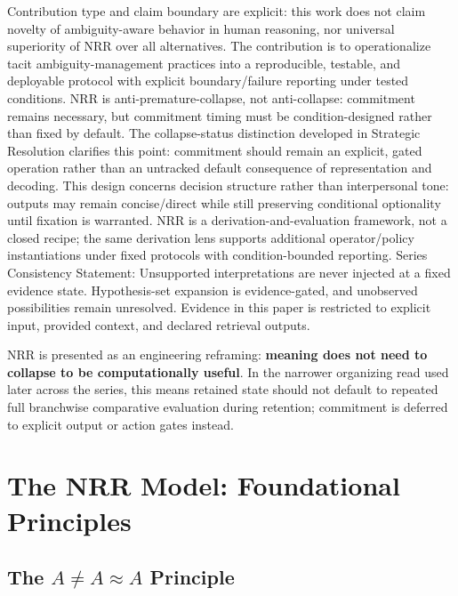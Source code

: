 \documentclass[11pt,a4paper]{article}
\newcommand{\AneqAapproxA}{A \neq A \approx A}
\begin{document}
Contribution type and claim boundary are explicit: this work does not claim novelty of ambiguity-aware behavior in human reasoning, nor universal superiority of NRR over all alternatives. The contribution is to operationalize tacit ambiguity-management practices into a reproducible, testable, and deployable protocol with explicit boundary/failure reporting under tested conditions.
NRR is anti-premature-collapse, not anti-collapse: commitment remains necessary, but commitment timing must be condition-designed rather than fixed by default.
The collapse-status distinction developed in Strategic Resolution clarifies this point: commitment should remain an explicit, gated operation rather than an untracked default consequence of representation and decoding.
This design concerns decision structure rather than interpersonal tone: outputs may remain concise/direct while still preserving conditional optionality until fixation is warranted.
NRR is a derivation-and-evaluation framework, not a closed recipe; the same derivation lens supports additional operator/policy instantiations under fixed protocols with condition-bounded reporting.
Series Consistency Statement: Unsupported interpretations are never injected at a fixed evidence state. Hypothesis-set expansion is evidence-gated, and unobserved possibilities remain unresolved. Evidence in this paper is restricted to explicit input, provided context, and declared retrieval outputs.

NRR is presented as an engineering reframing: \textbf{meaning does not need to collapse to be computationally useful}. In the narrower organizing read used later across the series, this means retained state should not default to repeated full branchwise comparative evaluation during retention; commitment is deferred to explicit output or action gates instead.

\section{The NRR Model: Foundational Principles}

\subsection{The $\AneqAapproxA$ Principle}
\end{document}
